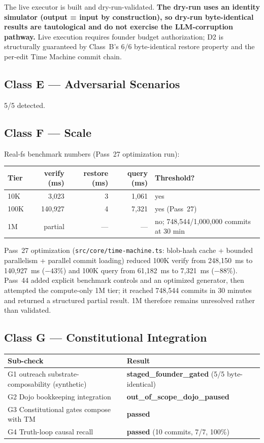 \documentclass[11pt]{article}
\begin{document}
The live executor is built and dry-run-validated. \textbf{The dry-run uses an identity simulator (output = input by construction), so dry-run byte-identical results are tautological and do not exercise the LLM-corruption pathway.} Live execution requires founder budget authorization; D2 is structurally guaranteed by Class~B's 6/6 byte-identical restore property and the per-edit Time Machine commit chain.

\subsection{Class E --- Adversarial Scenarios}

5/5 detected.

\subsection{Class F --- Scale}

Real-fs benchmark numbers (Pass~27 optimization run):

\begin{tabular}{lrrrl}
\toprule
Tier & verify (ms) & restore (ms) & query (ms) & Threshold? \\
\midrule
10K  & 3{,}023  & 3 & 1{,}061 & yes \\
100K & 140{,}927 & 4 & 7{,}321 & yes (Pass~27) \\
1M   & partial & --- & --- & no; 748{,}544/1{,}000{,}000 commits at 30 min \\
\bottomrule
\end{tabular}

Pass~27 optimization (\texttt{src/core/time-machine.ts}: blob-hash cache + bounded parallelism + parallel commit loading) reduced 100K verify from 248{,}150~ms to 140{,}927~ms ($-43\%$) and 100K query from 61{,}182~ms to 7{,}321~ms ($-88\%$). Pass~44 added explicit benchmark controls and an optimized generator, then attempted the compute-only 1M tier; it reached 748{,}544 commits in 30 minutes and returned a structured partial result. 1M therefore remains unresolved rather than validated.

\subsection{Class G --- Constitutional Integration}

\begin{tabular}{ll}
\toprule
Sub-check & Result \\
\midrule
G1 outreach substrate-composability (synthetic) & \textbf{staged\_founder\_gated} (5/5 byte-identical) \\
G2 Dojo bookkeeping integration & \textbf{out\_of\_scope\_dojo\_paused} \\
G3 Constitutional gates compose with TM & \textbf{passed} \\
G4 Truth-loop causal recall & \textbf{passed} (10 commits, 7/7, 100\%) \\
\bottomrule
\end{tabular}
\end{document}
